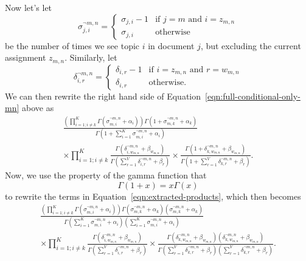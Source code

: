 \documentclass[11pt]{article}
\begin{document}
Now let's let
\begin{equation}
  \sigma_{j,i}^{\neg m,n} = \begin{cases}
    \sigma_{j,i} - 1 & \text{if } j = m \text{ and } i = z_{m,n}\\
    \sigma_{j,i} & \text{otherwise}
  \end{cases}
\end{equation}
be the number of times we see topic $i$ in document $j$, but excluding the
current assignment $z_{m,n}$. Similarly, let
\begin{equation}
  \delta_{i,r}^{\neg m,n} = \begin{cases}
    \delta_{i,r} - 1 & \text{if } i = z_{m,n} \text{ and } r = w_{m,n}\\
    \delta_{i,r} & \text{otherwise}.
  \end{cases}
\end{equation}
We can then rewrite the right hand side of
Equation~\ref{eqn:full-conditional-only-mn} above as
\begin{multline}
  \frac{\left(\prod_{i=1; i \neq k}^K \Gamma(\sigma_{m,i}^{\neg m,n} +
  \alpha_i)\right) \Gamma(1 + \sigma_{m,k}^{\neg m,n} + \alpha_k)}
  {\Gamma\left(1 + \sum_{i=1}^K \sigma_{m,i}^{\neg m,n} + \alpha_i\right)}
  \\
  \label{eqn:extracted-products}
  \times
  \prod_{i=1; i \neq k}^K
  \frac{\Gamma(\delta_{i,w_{m,n}}^{\neg m, n} + \beta_{w_{m,n}})}
  {\Gamma\left(\sum_{r=1}^V \delta_{i,r}^{\neg m, n} + \beta_{r}\right)}
  \times
  \frac{\Gamma(1 + \delta_{k,w_{m,n}}^{\neg m, n} + \beta_{w_{m,n}})}
  {\Gamma\left(1 + \sum_{r=1}^V \delta_{k,r}^{\neg m, n} + \beta_r\right)}.
\end{multline}
Now, we use the property of the gamma function that
\begin{equation}
  \Gamma(1 + x) = x \Gamma(x)
\end{equation}
to rewrite the terms in Equation~\ref{eqn:extracted-products}, which then
becomes
\begin{multline}
  \frac{\left(\prod_{i=1; i \neq k}^K \Gamma(\sigma_{m,i}^{\neg m,n} +
  \alpha_i)\right)
  \Gamma(\sigma_{m,k}^{\neg m,n} + \alpha_k)(\sigma_{m,k}^{\neg m,n} +
  \alpha_k)}
  {\Gamma\left(\sum_{i=1}^K \sigma_{m,i}^{\neg m,n} + \alpha_i\right)
  \left(\sum_{i=1}^K \sigma_{m,i}^{\neg m,n} + \alpha_i\right)}
  \\
  \times
  \prod_{i=1; i \neq k}^K
  \frac{\Gamma(\delta_{i,w_{m,n}}^{\neg m, n} + \beta_{w_{m,n}})}
  {\Gamma\left(\sum_{r=1}^V \delta_{i,r}^{\neg m, n} + \beta_{r}\right)}
  \times
  \frac{\Gamma(\delta_{k,w_{m,n}}^{\neg m, n} + \beta_{w_{m,n}})
  (\delta_{k,w_{m,n}}^{\neg m, n} + \beta_{w_{m,n}})}
  {\Gamma\left(\sum_{r=1}^V \delta_{k,r}^{\neg m, n} + \beta_r\right)
  \left(
    \sum_{r=1}^V \delta_{k,r}^{\neg m, n} + \beta_r
  \right)}.
\end{multline}
\end{document}
